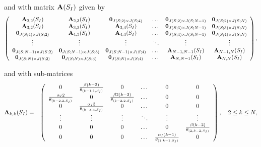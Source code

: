 \documentclass[10pt,A4paper]{article}
\begin{document}
\par\noindent and with matrix ${\bf A}(S_I)$ given by
\begin{equation*}
  \left(\begin{array}{cccccc}
{\bf A}_{2,2}(S_I) & {\bf A}_{2,3}(S_I) & {\bf 0}_{J(S;2)\times J(S;4)} & \dots & {\bf 0}_{J(S;2)\times J(S;N-1)} & {\bf 0}_{J(S;2)\times J(S;N)}\\
{\bf A}_{3,2}(S_I) & {\bf A}_{3,3}(S_I) & {\bf A}_{3,4}(S_I) & \dots & {\bf 0}_{J(S;3)\times J(S;N-1)} & {\bf 0}_{J(S;3)\times J(S;N)}\\
{\bf 0}_{J(S;4)\times J(S;2)} & {\bf A}_{4,3}(S_I) & {\bf A}_{4,4}(S_I) & \dots & {\bf 0}_{J(S;4)\times J(S;N-1)} & {\bf 0}_{J(S;4)\times J(S;N)}\\
\vdots & \vdots & \vdots & \ddots & \vdots & \vdots\\
{\bf 0}_{J(S;N-1)\times J(S;2)} & {\bf 0}_{J(S;N-1)\times J(S;3)} & {\bf 0}_{J(S;N-1)\times J(S;4)} & \dots & {\bf A}_{N-1,N-1}(S_I) & {\bf A}_{N-1,N}(S_I) \\
{\bf 0}_{J(S;N)\times J(S;2)} & {\bf 0}_{J(S;N)\times J(S;3)} & {\bf 0}_{J(S;N)\times J(S;4)} & \dots & {\bf A}_{N,N-1}(S_I) & {\bf A}_{N,N}(S_I)
                        \end{array}\right),
\end{equation*}
\par\noindent and with sub-matrices
\begin{eqnarray*}
 {\bf A}_{k,k}(S_I) &=& \left(\begin{array}{cccccc}
0 & \frac{\beta(k-2)}{\theta_{(k-1,1,S_I)}} & 0 & \dots & 0 & 0\\
\frac{\alpha_I2}{\theta_{(k-2,2,S_I)}} & 0 & \frac{\beta2(k-3)}{\theta_{(k-2,2,S_I)}} & \dots & 0 & 0\\
0 & \frac{\alpha_I3}{\theta_{(k-3,3,S_I)}} & 0 & \dots & 0 & 0\\
\vdots & \vdots & \vdots & \ddots & \vdots & \vdots\\
0 & 0 & 0 & \dots & 0 & \frac{\beta(k-2)}{\theta_{(2,k-2,S_I)}}\\
0 & 0 & 0 & \dots & \frac{\alpha_I(k-1)}{\theta_{(1,k-1,S_I)}} & 0
                        \end{array}\right),\quad 2\leq k\leq N,
\end{eqnarray*}
\end{document}
